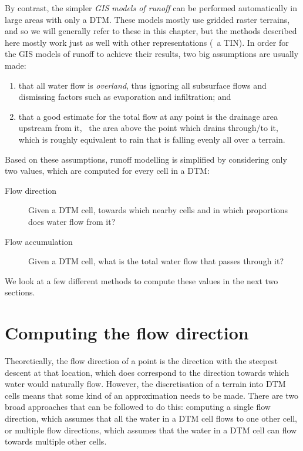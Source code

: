 By contrast, the simpler \emph{GIS models of runoff} can be performed automatically in large areas with only a DTM\@.
These models mostly use gridded raster terrains, and so we will generally refer to these in this chapter, but the methods described here mostly work just as well with other representations (\eg\ a TIN).
In order for the GIS models of runoff to achieve their results, two big assumptions are usually made:

\begin{enumerate}
\item that all water flow is \emph{overland}, thus ignoring all subsurface flows and dismissing factors such as evaporation and infiltration; and
\item that a good estimate for the total flow at any point is the drainage area upstream from it, \ie\ the area above the point which drains through/to it, which is roughly equivalent to rain that is falling evenly all over a terrain.
\end{enumerate}

Based on these assumptions, runoff modelling is simplified by considering only two values, which are computed for every cell in a DTM\@:

\begin{description}
\item[Flow direction]
Given a DTM cell, towards which nearby cells and in which proportions does water flow from it?
\item[Flow accumulation]
Given a DTM cell, what is the total water flow that passes through it?
\end{description}

We look at a few different methods to compute these values in the next two sections.

\section{Computing the flow direction}%
\label{se:direction}

Theoretically, the flow direction of a point is the direction with the steepest descent at that location, which does correspond to the direction towards which water would naturally flow.
However, the discretisation of a terrain into DTM cells means that some kind of an approximation needs to be made.
There are two broad approaches that can be followed to do this: computing a single flow direction, which assumes that all the water in a DTM cell flows to one other cell, or multiple flow directions, which assumes that the water in a DTM cell can flow towards multiple other cells.

